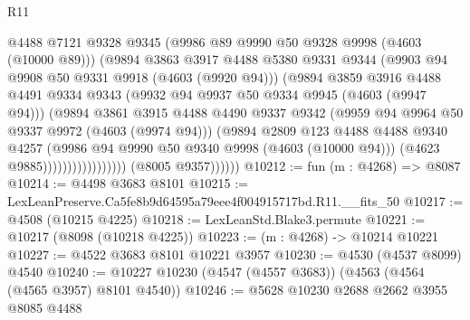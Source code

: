 \begin{lexlean}{R11}
\begin{coremodule}
                                      @4488
                                      @7121
                                      @9328
                                      @9345
                                      (@9986 @89 @9990 @50 @9328 @9998 (@4603 (@10000 @89)))
                                      (@9894
                                        @3863
                                        @3917
                                        @4488
                                        @5380
                                        @9331
                                        @9344
                                        (@9903 @94 @9908 @50 @9331 @9918 (@4603 (@9920 @94)))
                                        (@9894
                                          @3859
                                          @3916
                                          @4488
                                          @4491
                                          @9334
                                          @9343
                                          (@9932 @94 @9937 @50 @9334 @9945 (@4603 (@9947 @94)))
                                          (@9894
                                            @3861
                                            @3915
                                            @4488
                                            @4490
                                            @9337
                                            @9342
                                            (@9959 @94 @9964 @50 @9337 @9972 (@4603 (@9974 @94)))
                                            (@9894
                                              @2809
                                              @123
                                              @4488
                                              @4488
                                              @9340
                                              @4257
                                              (@9986 @94 @9990 @50 @9340 @9998 (@4603 (@10000 @94)))
                                              (@4623 @9885)))))))))))))))))
              (@8005 @9357))))))
@10212 := fun (m : @4268) => @8087
@10214 := @4498 @3683 @8101
@10215 := LexLeanPreserve.Ca5fe8b9d64595a79eee4f004915717bd.R11.__fits_50
@10217 := @4508 (@10215 @4225)
@10218 := LexLeanStd.Blake3.permute
@10221 := @10217 (@8098 (@10218 @4225))
@10223 := (m : @4268) -> @10214 @10221
@10227 := @4522 @3683 @8101 @10221 @3957
@10230 := @4530 (@4537 @8099) @4540
@10240 := @10227 @10230 (@4547 (@4557 @3683)) (@4563 (@4564 (@4565 @3957) @8101 @4540))
@10246 := @5628 @10230 @2688 @2662 @3955 @8085 @4488

\end{coremodule}
\end{lexlean}

